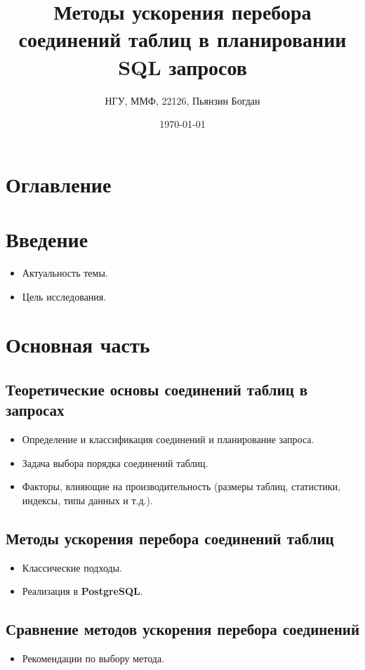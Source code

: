 \documentclass[12pt]{article}
\title{Методы ускорения перебора соединений таблиц в планировании SQL запросов}
\author{НГУ, ММФ, 22126, Пьянзин Богдан}
\date{\today}
\begin{document}
\begin{flushleft}
\maketitle

\newpage


\centering \section*{Оглавление}
\raggedright
{}

\section*{Введение}
\begin{itemize}
    \item Актуальность темы.
    \item Цель исследования.
\end{itemize}

\section*{Основная часть}

\subsection*{Теоретические основы соединений таблиц в запросах}
\begin{itemize}
    \item Определение и классификация соединений и планирование запроса.
    \item Задача выбора порядка соединений таблиц.
    \item Факторы, влияющие на производительность (размеры таблиц, статистики, индексы, типы данных и т.д.).
\end{itemize}

\subsection*{Методы ускорения перебора соединений таблиц}
\begin{itemize}
    \item Классические подходы.
    \item Реализация в \textbf{PostgreSQL}.
\end{itemize}

\subsection*{Сравнение методов ускорения перебора соединений}
\begin{itemize}
    \item Рекомендации по выбору метода.
\end{itemize}


\end{flushleft}
\end{document}
